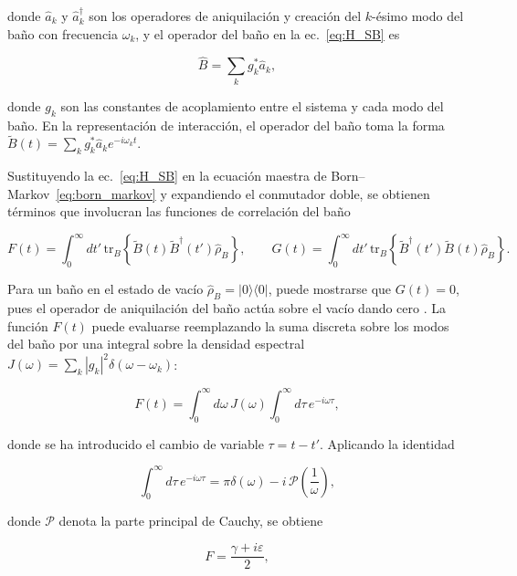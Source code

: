 donde $\hat{a}_k$ y $\hat{a}_k^\dagger$ son los operadores de aniquilación y creación del $k$-ésimo modo del baño con frecuencia $\omega_k$, y el operador del baño en la ec.~\eqref{eq:H_SB} es

\begin{equation}
	\hat{B} = \sum_k g_k^*\hat{a}_k,
	\label{eq:B_operador}
\end{equation}

donde $g_k$ son las constantes de acoplamiento entre el sistema y cada modo del baño. En la representación de interacción, el operador del baño toma la forma $\tilde{B}(t) = \sum_k g_k^*\hat{a}_k e^{-i\omega_k t}$.

Sustituyendo la ec.~\eqref{eq:H_SB} en la ecuación maestra de Born--Markov~\eqref{eq:born_markov} y expandiendo el conmutador doble, se obtienen términos que involucran las funciones de correlación del baño \cite{brasil2013}

\begin{equation}
	F(t) = \int_0^\infty dt'\,
	\mathrm{tr}_B\!\left\{\tilde{B}(t)\tilde{B}^\dagger(t')
	\hat{\rho}_B\right\},
	\qquad
	G(t) = \int_0^\infty dt'\,
	\mathrm{tr}_B\!\left\{\tilde{B}^\dagger(t')\tilde{B}(t)
	\hat{\rho}_B\right\}.
	\label{eq:FG}
\end{equation}

Para un baño en el estado de vacío $\hat{\rho}_B = |0\rangle\langle 0|$, puede mostrarse que $G(t) = 0$, pues el operador de aniquilación del baño actúa sobre el vacío dando cero \cite{brasil2013}. La función $F(t)$ puede evaluarse reemplazando la suma discreta sobre los modos del baño por una integral sobre la densidad espectral $J(\omega) = \sum_k|g_k|^2\delta(\omega-\omega_k)$:

\begin{equation}
	F(t) = \int_0^\infty d\omega\,J(\omega)\int_0^\infty
	d\tau\,e^{-i\omega\tau},
	\label{eq:F_integral}
\end{equation}

donde se ha introducido el cambio de variable $\tau = t - t'$. Aplicando la identidad

\begin{equation}
	\int_0^\infty d\tau\,e^{-i\omega\tau} = \pi\delta(\omega) -
	i\,\mathcal{P}\!\left(\frac{1}{\omega}\right),
	\label{eq:identidad_markov}
\end{equation}

donde $\mathcal{P}$ denota la parte principal de Cauchy, se obtiene

\begin{equation}
	F = \frac{\gamma + i\varepsilon}{2},
	\label{eq:F_final}
\end{equation}

